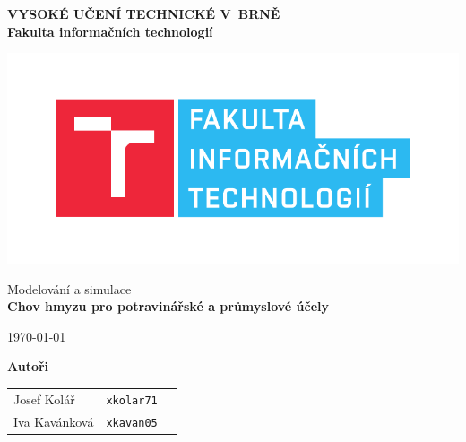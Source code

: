 \begin{titlepage}

    \centering

    {\fontsize{20pt}{15pt}\bfseries
    VYSOKÉ UČENÍ TECHNICKÉ V~BRNĚ\\
    \vspace{8pt}
    Fakulta informačních technologií
    }

    \includegraphics[scale=0.7]{./assets/fit-logo.pdf}

    \vspace{22pt}

    {\Large Modelování a simulace\\}
    \vspace{4pt}
    {\LARGE \bfseries Chov hmyzu pro potravinářské a průmyslové účely}

    \vspace{180pt}
    {\Large \today}

    \vspace{90pt}
    {\Large \bfseries Autoři\\}
    \vspace{12pt}

    \begin{tabular}{ l c r }
        Josef Kolář & \texttt{xkolar71} \\
        Iva Kavánková & \texttt{xkavan05} \\
    \end{tabular}\\

\end{titlepage}